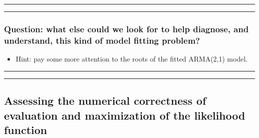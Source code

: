 \documentclass[]{article}
\providecommand{\tightlist}{%
  \setlength{\itemsep}{0pt}\setlength{\parskip}{0pt}}
\begin{document}
\begin{center}\rule{0.5\linewidth}{\linethickness}\end{center}

\begin{center}\rule{0.5\linewidth}{\linethickness}\end{center}

\subsubsection{Question: what else could we look for to help diagnose,
and understand, this kind of model fitting
problem?}\label{question-what-else-could-we-look-for-to-help-diagnose-and-understand-this-kind-of-model-fitting-problem}


\begin{itemize}
\tightlist
\item
  Hint: pay some more attention to the roots of the fitted ARMA(2,1)
  model.
\end{itemize}

\begin{center}\rule{0.5\linewidth}{\linethickness}\end{center}

\begin{center}\rule{0.5\linewidth}{\linethickness}\end{center}

\subsection{Assessing the numerical correctness of evaluation and
maximization of the likelihood
function}\label{assessing-the-numerical-correctness-of-evaluation-and-maximization-of-the-likelihood-function}
\end{document}
